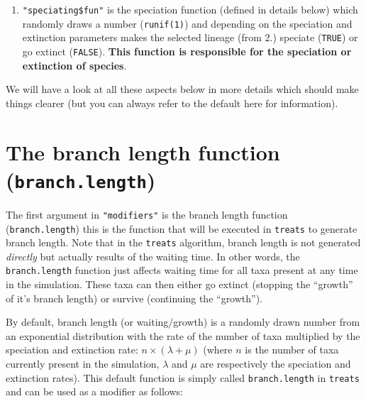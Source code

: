 \documentclass[
]{book}
\newenvironment{Shaded}{\begin{snugshade}}{\end{snugshade}}
\newcommand{\DecValTok}[1]{\textcolor[rgb]{0.00,0.00,0.81}{#1}}
\newcommand{\ErrorTok}[1]{\textcolor[rgb]{0.64,0.00,0.00}{\textbf{#1}}}
\newcommand{\KeywordTok}[1]{\textcolor[rgb]{0.13,0.29,0.53}{\textbf{#1}}}
\newcommand{\NormalTok}[1]{#1}
\newcommand{\OperatorTok}[1]{\textcolor[rgb]{0.81,0.36,0.00}{\textbf{#1}}}
\newcommand{\StringTok}[1]{\textcolor[rgb]{0.31,0.60,0.02}{#1}}
\providecommand{\tightlist}{%
  \setlength{\itemsep}{0pt}\setlength{\parskip}{0pt}}
\begin{document}
\begin{enumerate}
\def\labelenumi{\arabic{enumi}.}
\setcounter{enumi}{2}
\tightlist
\item
  \texttt{"speciating\$fun"} is the speciation function (defined in details below) which randomly draws a number (\texttt{runif(1)}) and depending on the speciation and extinction parameters makes the selected lineage (from 2.) speciate (\texttt{TRUE}) or go extinct (\texttt{FALSE}). \textbf{This function is responsible for the speciation or extinction of species}.
\end{enumerate}

\begin{Shaded}
\end{Shaded}

We will have a look at all these aspects below in more details which should make things clearer (but you can always refer to the default here for information).

\hypertarget{the-branch-length-function-branch.length}{%
\section{\texorpdfstring{The branch length function (\texttt{branch.length})}{The branch length function (branch.length)}}\label{the-branch-length-function-branch.length}}

The first argument in \texttt{"modifiers"} is the branch length function (\texttt{branch.length}) this is the function that will be executed in \texttt{treats} to generate branch length.
Note that in the \texttt{treats} algorithm, branch length is not generated \emph{directly} but actually results of the waiting time.
In other words, the \texttt{branch.length} function just affects waiting time for all taxa present at any time in the simulation.
These taxa can then either go extinct (stopping the ``growth'' of it's branch length) or survive (continuing the ``growth'').

By default, branch length (or waiting/growth) is a randomly drawn number from an exponential distribution with the rate of the number of taxa multiplied by the speciation and extinction rate: \(n \times (\lambda + \mu)\) (where \(n\) is the number of taxa currently present in the simulation, \(\lambda\) and \(\mu\) are respectively the speciation and extinction rates).
This default function is simply called \texttt{branch.length} in \texttt{treats} and can be used as a modifier as follows:
\end{document}
